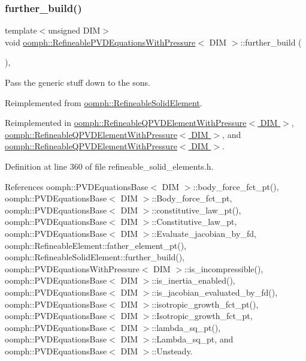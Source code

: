 \subsubsection{\texorpdfstring{further\+\_\+build()}{further\_build()}}
{\footnotesize\ttfamily template$<$unsigned D\+IM$>$ \\
void \hyperlink{classoomph_1_1RefineablePVDEquationsWithPressure}{oomph\+::\+Refineable\+P\+V\+D\+Equations\+With\+Pressure}$<$ D\+IM $>$\+::further\+\_\+build (\begin{DoxyParamCaption}{ }\end{DoxyParamCaption})\hspace{0.3cm}{\ttfamily [inline]}, {\ttfamily [virtual]}}



Pass the generic stuff down to the sons. 



Reimplemented from \hyperlink{classoomph_1_1RefineableSolidElement_a159967ccbb5327b2ee04154a11b1b51c}{oomph\+::\+Refineable\+Solid\+Element}.



Reimplemented in \hyperlink{classoomph_1_1RefineableQPVDElementWithPressure_ab1e141199db731d930fd5b0a70b994b3}{oomph\+::\+Refineable\+Q\+P\+V\+D\+Element\+With\+Pressure$<$ D\+I\+M $>$}, \hyperlink{classoomph_1_1RefineableQPVDElementWithPressure_ab4406f1c6de1e8e2e704bd55a9409c87}{oomph\+::\+Refineable\+Q\+P\+V\+D\+Element\+With\+Pressure$<$ D\+I\+M $>$}, and \hyperlink{classoomph_1_1RefineableQPVDElementWithPressure_af2981a672382c6db25389aa7c82a6b30}{oomph\+::\+Refineable\+Q\+P\+V\+D\+Element\+With\+Pressure$<$ D\+I\+M $>$}.



Definition at line 360 of file refineable\+\_\+solid\+\_\+elements.\+h.



References oomph\+::\+P\+V\+D\+Equations\+Base$<$ D\+I\+M $>$\+::body\+\_\+force\+\_\+fct\+\_\+pt(), oomph\+::\+P\+V\+D\+Equations\+Base$<$ D\+I\+M $>$\+::\+Body\+\_\+force\+\_\+fct\+\_\+pt, oomph\+::\+P\+V\+D\+Equations\+Base$<$ D\+I\+M $>$\+::constitutive\+\_\+law\+\_\+pt(), oomph\+::\+P\+V\+D\+Equations\+Base$<$ D\+I\+M $>$\+::\+Constitutive\+\_\+law\+\_\+pt, oomph\+::\+P\+V\+D\+Equations\+Base$<$ D\+I\+M $>$\+::\+Evaluate\+\_\+jacobian\+\_\+by\+\_\+fd, oomph\+::\+Refineable\+Element\+::father\+\_\+element\+\_\+pt(), oomph\+::\+Refineable\+Solid\+Element\+::further\+\_\+build(), oomph\+::\+P\+V\+D\+Equations\+With\+Pressure$<$ D\+I\+M $>$\+::is\+\_\+incompressible(), oomph\+::\+P\+V\+D\+Equations\+Base$<$ D\+I\+M $>$\+::is\+\_\+inertia\+\_\+enabled(), oomph\+::\+P\+V\+D\+Equations\+Base$<$ D\+I\+M $>$\+::is\+\_\+jacobian\+\_\+evaluated\+\_\+by\+\_\+fd(), oomph\+::\+P\+V\+D\+Equations\+Base$<$ D\+I\+M $>$\+::isotropic\+\_\+growth\+\_\+fct\+\_\+pt(), oomph\+::\+P\+V\+D\+Equations\+Base$<$ D\+I\+M $>$\+::\+Isotropic\+\_\+growth\+\_\+fct\+\_\+pt, oomph\+::\+P\+V\+D\+Equations\+Base$<$ D\+I\+M $>$\+::lambda\+\_\+sq\+\_\+pt(), oomph\+::\+P\+V\+D\+Equations\+Base$<$ D\+I\+M $>$\+::\+Lambda\+\_\+sq\+\_\+pt, and oomph\+::\+P\+V\+D\+Equations\+Base$<$ D\+I\+M $>$\+::\+Unsteady.



